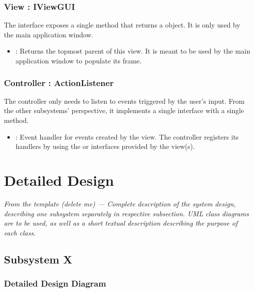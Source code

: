 \documentclass[12pt]{article}
\begin{document}
\subsubsection{View : IViewGUI}
The  interface exposes a single method that returns a  object. It is only used by the main application window.
\begin{itemize}
	\item {} : Returns the topmost parent  of this view. It is meant to be used by the main application window to populate its frame.
\end{itemize}

\subsubsection{Controller : ActionListener}
The controller only needs to listen to events triggered by the user's input. From the other subsystems' perspective, it implements a single interface with a single method.
\begin{itemize}
	\item {} : Event handler for  events created by the view. The controller registers its handlers by using the  or  interfaces provided by the view(s).
\end{itemize}








\section{Detailed Design} \label{sec:detail}

\textit {From the template (delete me) --- Complete description of the system design, describing one subsystem separately in respective subsection. UML class diagrams are to be used, as well as a short textual description describing the purpose of each class.}

\subsection{Subsystem X}

\subsubsection{Detailed Design Diagram}
\end{document}
